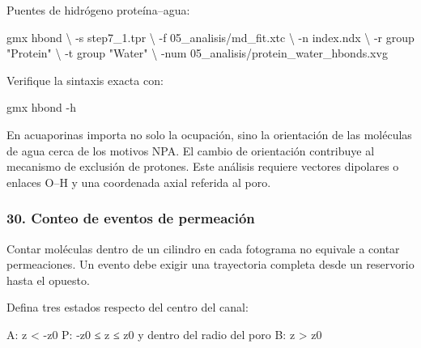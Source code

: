 \documentclass[
  spanish,
  11pt,
  a4paper]{article}
\newenvironment{Shaded}{\begin{snugshade}}{\end{snugshade}}
\newcommand{\AttributeTok}[1]{\textcolor[rgb]{0.13,0.29,0.53}{#1}}
\newcommand{\DataTypeTok}[1]{\textcolor[rgb]{0.13,0.29,0.53}{#1}}
\newcommand{\ExtensionTok}[1]{#1}
\newcommand{\NormalTok}[1]{#1}
\newcommand{\StringTok}[1]{\textcolor[rgb]{0.31,0.60,0.02}{#1}}
\begin{document}
Puentes de hidrógeno proteína--agua:

\begin{Shaded}
\begin{Highlighting}[]
\ExtensionTok{gmx}\NormalTok{ hbond }\DataTypeTok{\textbackslash{}}
    \AttributeTok{{-}s}\NormalTok{ step7\_1.tpr }\DataTypeTok{\textbackslash{}}
    \AttributeTok{{-}f}\NormalTok{ 05\_analisis/md\_fit.xtc }\DataTypeTok{\textbackslash{}}
    \AttributeTok{{-}n}\NormalTok{ index.ndx }\DataTypeTok{\textbackslash{}}
    \AttributeTok{{-}r} \StringTok{\textquotesingle{}group "Protein"\textquotesingle{}} \DataTypeTok{\textbackslash{}}
    \AttributeTok{{-}t} \StringTok{\textquotesingle{}group "Water"\textquotesingle{}} \DataTypeTok{\textbackslash{}}
    \AttributeTok{{-}num}\NormalTok{ 05\_analisis/protein\_water\_hbonds.xvg}
\end{Highlighting}
\end{Shaded}

Verifique la sintaxis exacta con:

\begin{Shaded}
\begin{Highlighting}[]
\ExtensionTok{gmx}\NormalTok{ hbond }\AttributeTok{{-}h}
\end{Highlighting}
\end{Shaded}

En acuaporinas importa no solo la ocupación, sino la orientación de las
moléculas de agua cerca de los motivos NPA. El cambio de orientación
contribuye al mecanismo de exclusión de protones. Este análisis requiere
vectores dipolares o enlaces O--H y una coordenada axial referida al
poro.

\subsubsection{30. Conteo de eventos de
permeación}\label{conteo-de-eventos-de-permeaciuxf3n}

Contar moléculas dentro de un cilindro en cada fotograma no equivale a
contar permeaciones. Un evento debe exigir una trayectoria completa
desde un reservorio hasta el opuesto.

Defina tres estados respecto del centro del canal:

\begin{Shaded}
\begin{Highlighting}[]
\NormalTok{A: z \textless{} {-}z0}
\NormalTok{P: {-}z0 ≤ z ≤ z0 y dentro del radio del poro}
\NormalTok{B: z \textgreater{} z0}
\end{Highlighting}
\end{Shaded}
\end{document}
